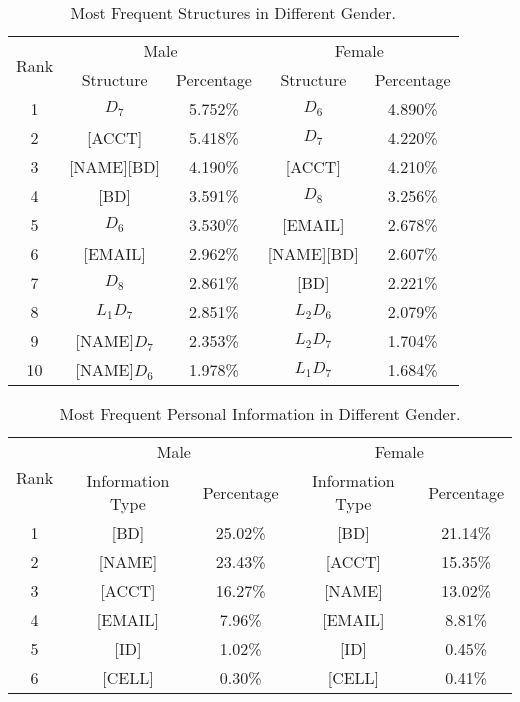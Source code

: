 \begin{table}
\centering
\caption{Most Frequent Structures in Different Gender.}
\begin{adjustbox}{max width=0.48\textwidth}
\begin{tabular}{|c|c|c|c|c|} \hline
\multirow{2}{*}{Rank}&\multicolumn{2}{|c|}{Male}&\multicolumn{2}{|c|}{Female}\\ \cline{2-5}
&Structure&Percentage&Structure&Percentage\\ \hline
1&$D_7$&5.752\%&$D_6$&4.890\%\\
2&[ACCT]&5.418\%&$D_7$&4.220\%\\
3&[NAME][BD]&4.190\%&[ACCT]&4.210\%\\
4&[BD]&3.591\%&$D_8$&3.256\%\\
5&$D_6$&3.530\%&[EMAIL]&2.678\%\\
6&[EMAIL]&2.962\%&[NAME][BD]&2.607\%\\
7&$D_8$&2.861\%&[BD]&2.221\%\\
8&$L_1D_7$&2.851\%&$L_2D_6$&2.079\%\\
9&[NAME]$D_7$&2.353\%&$L_2D_7$&1.704\%\\
10&[NAME]$D_6$&1.978\%&$L_1D_7$&1.684\%\\
\hline\end{tabular}
\end{adjustbox}
\label{t5}
\end{table}

\begin{table}
\centering
\caption{Most Frequent Personal Information in Different Gender.}
\begin{adjustbox}{max width=0.48\textwidth}
\begin{tabular}{|c|c|c|c|c|} \hline
\multirow{2}{*}{Rank}&\multicolumn{2}{|c|}{Male}&\multicolumn{2}{|c|}{Female}\\ \cline{2-5}
&Information Type&Percentage&Information Type&Percentage\\ \hline
1&[BD]&25.02\%&[BD]&21.14\%  \\
2&[NAME]&23.43\%&[ACCT]&15.35\%\\
3&[ACCT]&16.27\%&[NAME]&13.02\%\\
4&[EMAIL]&7.96\%&[EMAIL]&8.81\%\\
5&[ID]&1.02\%&[ID]&0.45\%\\
6&[CELL]&0.30\%&[CELL]&0.41\%\\
\hline\end{tabular}
\end{adjustbox}
\label{t6}
\end{table}

